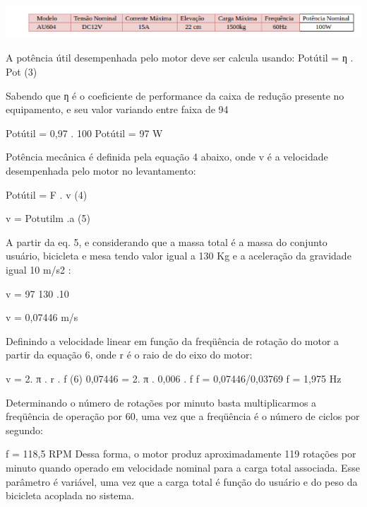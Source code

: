  \begin{center}
    	\includegraphics[scale=0.7]{figuras/calculado}
        \label{calculado}
    \end{center}   
                       
A potência útil desempenhada pelo motor deve ser calcula usando: 
                       Potútil  = ƞ . Pot     (3) 

Sabendo que ƞ é o coeficiente de performance da caixa de redução presente no equipamento, e seu valor variando entre faixa de 94%

                             Potútil  = 0,97 . 100
                               Potútil  = 97 W                          

Potência mecânica é definida pela equação 4 abaixo, onde v é a velocidade desempenhada pelo motor no levantamento:  

                           Potútil = F . v                    (4)

                               v =     Potutilm  .a          (5) 


A partir da eq. 5, e considerando que a massa total é a massa do conjunto usuário, bicicleta e mesa tendo valor igual a 130 Kg e a aceleração da gravidade igual 10 m/s2 : 

                               v =     97 130 .10           

                         v = 0,07446 m/s
           
Definindo a velocidade linear em função da freqüência de rotação do motor a partir da equação 6, onde r é o raio de do eixo do motor: 

                          v = 2. π . r . f         (6)
                          0,07446  = 2. π . 0,006 . f       
                         f  = 0,07446/0,03769 
                         f  = 1,975 Hz 

Determinando o número de rotações por minuto basta multiplicarmos a freqüência de operação por 60, uma vez que a freqüência é o número de ciclos por segundo: 

                             f  = 118,5 RPM 
Dessa forma, o motor produz aproximadamente 119 rotações por minuto quando operado em velocidade nominal para a carga total associada. Esse parâmetro é variável, uma vez que a carga total é função do usuário e do peso da bicicleta acoplada no sistema. 
